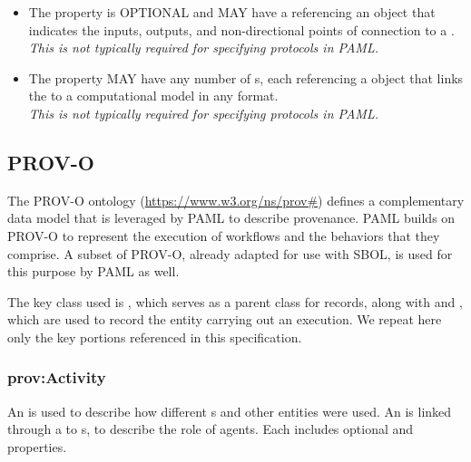 \begin{itemize}
\item \label{sec:sbol:hasInterface}
The  property is OPTIONAL and MAY have a  referencing an  object that indicates the inputs, outputs, and non-directional points of connection to a .
\\{\em This is not typically required for specifying protocols in PAML.}

\item \label{sec:sbol:hasModel}
The  property MAY have any number of s, each referencing a  object that links the  to a computational model in any format.
\\{\em This is not typically required for specifying protocols in PAML.}
\end{itemize}

\subsection{PROV-O}

The PROV-O ontology (\url{https://www.w3.org/ns/prov#}) defines a complementary data model that is leveraged by PAML to describe provenance.
PAML builds on PROV-O to represent the execution of  workflows and the  behaviors that they comprise.
A subset of PROV-O, already adapted for use with SBOL, is used for this purpose by PAML as well.

The key class used is , which serves as a parent class for  records, along with  and , which are used to record the entity carrying out an execution.
We repeat here only the key portions referenced in this specification.

\subsubsection{prov:Activity}
\label{sec:prov:Activity}

An  is used to describe how different s and other entities were used. An  is linked through a  to s, to describe the role of agents.
Each  includes optional  and  properties. 

